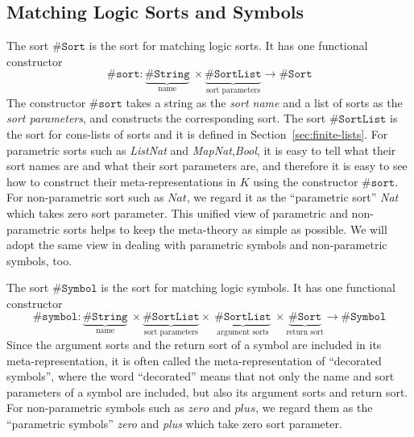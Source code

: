 \documentclass[UTF8,11pt]{article}
\theoremstyle{plain}
\theoremstyle{definition}
\theoremstyle{remark}
\newcommand{\Nat}{\textit{Nat}}
\newcommand{\Bool}{\textit{Bool}}
\newcommand{\List}{\textit{List}}
\newcommand{\Map}{\textit{Map}}
\newcommand{\parametric}[2]{{#1}\raisebox{.2ex}{\texttt{\footnotesize{\{}}}#2\raisebox{.2ex}{\texttt{\footnotesize{\}}}}}
\newcommand{\zero}{\textit{zero}}
\newcommand{\sharpsymbol}{\#}
\newcommand{\KString}{\texttt{\sharpsymbol String}}
\newcommand{\KSort}{\texttt{\sharpsymbol Sort}}
\newcommand{\Ksort}{\texttt{\sharpsymbol sort}}
\newcommand{\KSymbol}{\texttt{\sharpsymbol Symbol}}
\newcommand{\Ksymbol}{\texttt{\sharpsymbol symbol}}
\newcommand{\KSortList}{\texttt{\sharpsymbol SortList}}
\begin{document}
\subsection{Matching Logic Sorts and Symbols}
\label{sec:ML-sorts-symbols}

The sort $\KSort$ is the sort for matching logic sorts.
It has one functional constructor
$$
\Ksort \colon \underbrace{\KString}_\text{name}\  \times 
\underbrace{\KSortList}_\text{sort parameters} \to \KSort
$$
The constructor $\Ksort$ takes a string as the \emph{sort name} and a list of 
sorts as the \emph{sort parameters},
and constructs the corresponding sort.
The sort $\KSortList$ is the sort for cons-lists of sorts and it is defined in 
Section~\ref{sec:finite-lists}.
For parametric sorts such as \parametric{\List}{\Nat} and 
\parametric{\Map}{\Nat,\Bool}, it is easy to tell what their sort names are and 
what their sort parameters are, and therefore it is easy to see how to 
construct their meta-representations in $K$ using the constructor $\Ksort$.
For non-parametric sort such as $\Nat$, we regard it as the ``parametric sort'' 
\parametric{\Nat}{} which takes zero sort parameter.
This unified view of parametric and non-parametric sorts helps to keep the 
meta-theory as simple as possible.
We will adopt the same view in dealing with parametric symbols and 
non-parametric symbols, too.

The sort $\KSymbol$ is the sort for matching logic symbols.
It has one functional constructor
\begin{equation*}
\Ksymbol \colon {\underbrace{\KString}_\text{name}}\ 
\times 
\underbrace{\KSortList}_\text{sort parameters} 
\times\ 
\underbrace{\KSortList}_\text{argument sorts} \ 
\times \underbrace{\KSort}_\text{return sort} \to 
\KSymbol
\end{equation*}
Since the argument sorts and the return sort of a symbol are included in its 
meta-representation, it is often called the meta-representation of ``decorated 
symbols'', where the word ``decorated'' means that not only the name and sort 
parameters of a symbol are included, but also its argument sorts and return 
sort.
For non-parametric symbols such as $\zero$ and $\textit{plus}$, we regard them 
as the ``parametric symbols'' \parametric{\zero}{} and 
\parametric{\textit{plus}}{} which take zero sort parameter.
\end{document}
